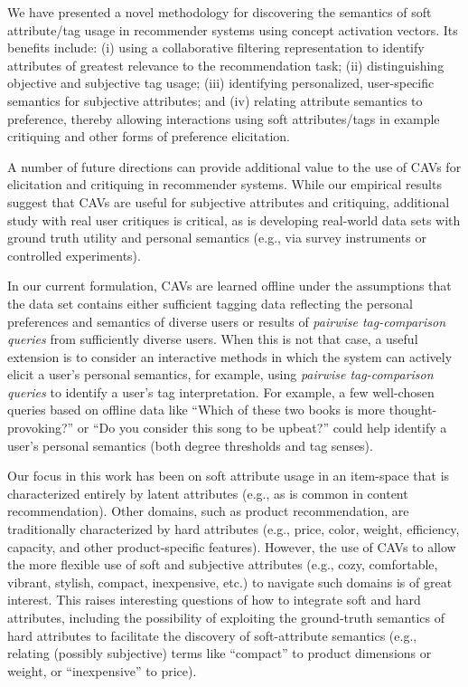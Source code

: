 \documentclass[manuscript,screen,nonacm]{acmart}
\newcommand{\1}{{\mathbf 1}}
\theoremstyle{TheoremNum}
\begin{document}
We have presented a novel methodology for discovering the semantics of soft attribute/tag usage in recommender systems using concept activation vectors. Its benefits include: (i) using a collaborative filtering representation to identify attributes of greatest relevance to the recommendation task; (ii) distinguishing objective and subjective tag usage; (iii) identifying personalized, user-specific semantics for subjective attributes; and (iv) relating attribute semantics to preference, thereby allowing interactions using soft attributes/tags in example critiquing and other forms of preference elicitation.

A number of future directions can provide additional value to the use of CAVs for elicitation and critiquing in recommender systems. While our empirical results suggest that CAVs are useful for subjective attributes and critiquing, additional study with real user critiques is critical, as is developing real-world data sets with ground truth utility and personal semantics (e.g., via survey instruments or controlled experiments).

In our current formulation, CAVs are learned offline under the assumptions that the data set contains either sufficient tagging data reflecting the personal preferences and semantics of diverse users 
or results of \emph{pairwise tag-comparison queries} from sufficiently diverse users.
When this is not that case, a useful extension is to consider an interactive methods in which the system can actively elicit a user's personal semantics, for example,
using \emph{pairwise tag-comparison queries} to identify a user's tag interpretation. For example, a few well-chosen queries based on offline data like
``Which of these two books is more thought-provoking?'' or ``Do you consider this song to be upbeat?'' could help identify a user's personal semantics (both degree thresholds and tag senses).

Our focus in this work has been on soft attribute usage in an item-space that is characterized entirely by latent attributes (e.g., as is common in content recommendation). Other domains, such as product recommendation, are traditionally characterized by hard attributes (e.g., price, color, weight, efficiency, capacity, and other product-specific features). However, the use of CAVs to allow the more flexible use of soft and subjective attributes (e.g., cozy, comfortable, vibrant, stylish, compact, inexpensive, etc.) to navigate such domains is of great interest. This raises interesting questions of how to integrate soft and hard attributes, including the possibility of exploiting the ground-truth semantics of hard attributes to facilitate the discovery of soft-attribute semantics (e.g., relating (possibly subjective) terms like ``compact'' to product dimensions or weight, or ``inexpensive'' to price).
\end{document}
